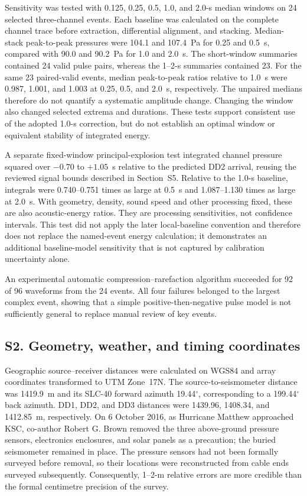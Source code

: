 \documentclass[]{seismica}
\begin{document}
Sensitivity was tested with 0.125, 0.25, 0.5, 1.0, and 2.0-s median windows on
24 selected three-channel events. Each baseline was calculated on the complete
channel trace before extraction, differential alignment, and stacking.
Median-stack peak-to-peak pressures were 104.1 and 107.4~Pa for 0.25 and
0.5~s, compared with 90.0 and 90.2~Pa for 1.0 and 2.0~s. The short-window
summaries contained 24 valid pulse pairs, whereas the 1--2-s summaries contained
23. For the same 23 paired-valid events, median peak-to-peak ratios relative
to 1.0~s were 0.987, 1.001, and 1.003 at 0.25, 0.5, and 2.0~s, respectively.
The unpaired medians therefore do not quantify a systematic amplitude change.
Changing the window
also changed selected extrema and durations. These tests support consistent
use of the adopted 1.0-s correction, but do not establish an optimal window
or equivalent stability of integrated energy.

A separate fixed-window principal-explosion test integrated channel pressure
squared over $-0.70$ to $+1.05$~s relative to the predicted DD2 arrival, reusing
the reviewed signal bounds described in Section~S5. Relative to the 1.0-s
baseline, integrals were 0.740--0.751 times as large at 0.5~s and
1.087--1.130 times as large at 2.0~s. With geometry, density, sound speed and
other processing fixed, these are also acoustic-energy ratios. They are
processing sensitivities, not confidence intervals. This test did not apply
the later local-baseline convention and therefore does not replace the
named-event energy calculation; it demonstrates an additional baseline-model
sensitivity that is not captured by calibration uncertainty alone.

An experimental automatic compression--rarefaction algorithm succeeded for
92 of 96 waveforms from the 24 events. All four failures belonged to the
largest complex event, showing that a simple positive-then-negative pulse model
is not sufficiently general to replace manual review of key events.

\FloatBarrier
\subsection{S2. Geometry, weather, and timing coordinates}
\label{sec:supp_weather}

Geographic source--receiver distances were calculated on WGS84 and array
coordinates transformed to UTM Zone~17N. The source-to-seismometer distance
was 1419.9~m and its SLC-40 forward azimuth 19.44$^\circ$, corresponding to a
199.44$^\circ$ back azimuth. DD1, DD2, and DD3 distances were 1439.96,
1408.34, and 1412.85~m, respectively. On 6 October 2016, as Hurricane Matthew approached
KSC, co-author Robert G. Brown removed the three above-ground pressure sensors,
electronics enclosures, and solar panels as a precaution; the buried
seismometer remained in place. The pressure sensors had not been formally
surveyed before removal, so their locations were reconstructed from cable ends
surveyed subsequently. Consequently, 1--2-m relative errors are more credible
than the formal centimetre precision of the survey.
\end{document}
